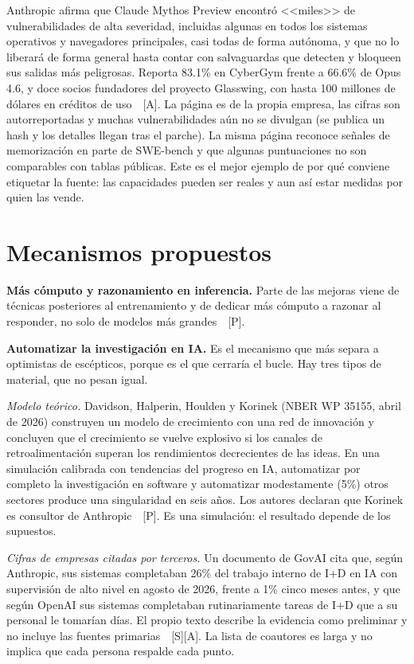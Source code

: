 \documentclass[10pt]{article}
\newcommand{\tP}{\textsf{\small[P]}}
\newcommand{\tS}{\textsf{\small[S]}}
\newcommand{\tA}{\textsf{\small[A]}}
\begin{document}
Anthropic afirma que Claude Mythos Preview encontr\'o <<miles>> de vulnerabilidades de alta severidad, incluidas algunas en todos los sistemas operativos y navegadores principales, casi todas de forma aut\'onoma, y que no lo liberar\'a de forma general hasta contar con salvaguardas que detecten y bloqueen sus salidas m\'as peligrosas. Reporta 83.1\% en CyberGym frente a 66.6\% de Opus 4.6, y doce socios fundadores del proyecto Glasswing, con hasta 100 millones de d\'olares en cr\'editos de uso~\cite{glasswing}~\tA. La p\'agina es de la propia empresa, las cifras son autorreportadas y muchas vulnerabilidades a\'un no se divulgan (se publica un hash y los detalles llegan tras el parche). La misma p\'agina reconoce se\~nales de memorizaci\'on en parte de SWE-bench y que algunas puntuaciones no son comparables con tablas p\'ublicas. Este es el mejor ejemplo de por qu\'e conviene etiquetar la fuente: las capacidades pueden ser reales y aun as\'i estar medidas por quien las vende.

\section{Mecanismos propuestos}

\textbf{M\'as c\'omputo y razonamiento en inferencia.} Parte de las mejoras viene de t\'ecnicas posteriores al entrenamiento y de dedicar m\'as c\'omputo a razonar al responder, no solo de modelos m\'as grandes~\cite{iasr2026}~\tP.

\textbf{Automatizar la investigaci\'on en IA.} Es el mecanismo que m\'as separa a optimistas de esc\'epticos, porque es el que cerrar\'ia el bucle. Hay tres tipos de material, que no pesan igual.

\emph{Modelo te\'orico.} Davidson, Halperin, Houlden y Korinek (NBER WP 35155, abril de 2026) construyen un modelo de crecimiento con una red de innovaci\'on y concluyen que el crecimiento se vuelve explosivo si los canales de retroalimentaci\'on superan los rendimientos decrecientes de las ideas. En una simulaci\'on calibrada con tendencias del progreso en IA, automatizar por completo la investigaci\'on en software y automatizar modestamente (5\%) otros sectores produce una singularidad en seis a\~nos. Los autores declaran que Korinek es consultor de Anthropic~\cite{davidson2026}~\tP. Es una simulaci\'on: el resultado depende de los supuestos.

\emph{Cifras de empresas citadas por terceros.} Un documento de GovAI cita que, seg\'un Anthropic, sus sistemas completaban 26\% del trabajo interno de I+D en IA con supervisi\'on de alto nivel en agosto de 2026, frente a 1\% cinco meses antes, y que seg\'un OpenAI sus sistemas completaban rutinariamente tareas de I+D que a su personal le tomar\'ian d\'ias. El propio texto describe la evidencia como preliminar y no incluye las fuentes primarias~\cite{govai}~\tS\tA. La lista de coautores es larga y no implica que cada persona respalde cada punto.
\end{document}
